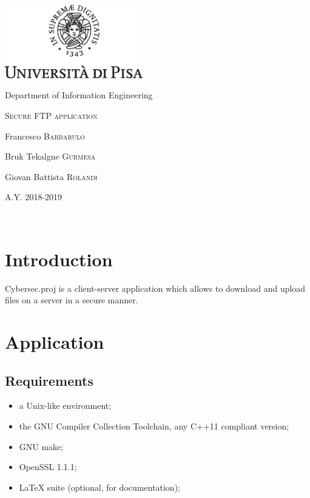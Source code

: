 \documentclass[a4paper,12pt]{article}
\newcommand{\projectname}{Cybersec.proj}
\begin{document}

{
  \begin{titlepage}
  	\centering
  	\includegraphics[width=6cm]{img/unipi.eps}\par
    \vspace{1.5cm}
    {\Large Department of Information Engineering \par}
  	\vspace{1.5cm}
  	{\huge\textsc{Secure FTP application}\par}
  	\vspace{2cm}
  	Francesco \textsc{Barbarulo}\par
  	Bruk Tekalgne \textsc{Gurmesa}\par
    Giovan Battista \textsc{Rolandi}

  	\vfill

  	{\large A.Y. 2018-2019\par}
  \end{titlepage}
}


\clearpage
~
\clearpage
\tableofcontents
\clearpage
~
\clearpage
{}

\section{Introduction}
\projectname{} is a client-server application which allows to download and upload files on a server in a secure manner.

\section{Application}
\subsection{Requirements}
\begin{itemize}
  \item a Unix-like environment;
  \item the GNU Compiler Collection Toolchain, any C++11 compliant version;
  \item GNU make;
  \item OpenSSL 1.1.1;
  \item LaTeX suite (optional, for documentation);
\end{itemize}
\end{document}
